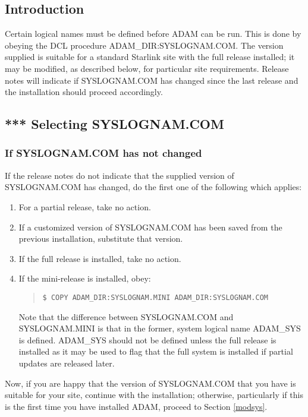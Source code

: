 \subsection{Introduction}
Certain logical names must be defined before ADAM can be run.
This is done by obeying the DCL procedure ADAM\_DIR:\-SYS\-LOGNAM.\-COM.
The version supplied is suitable for a standard Starlink site
with the full release installed; it may be modified, as described below,
for particular site requirements.
Release notes will indicate if SYS\-LOG\-NAM\-.COM has changed since the last
release and the installation should proceed accordingly.
\subsection{*** Selecting SYSLOGNAM.COM}
\subsubsection{If SYSLOGNAM.COM has not changed}
\label{nomodsys}
If the release notes do not indicate that the supplied version of
SYS\-LOGNAM\-.COM has changed, do the first one of the following which applies:
\begin{enumerate}
\item For a partial release, take no action.
\item If a customized version of SYSLOGNAM.COM has been saved from the previous
installation, substitute that version.
\item If the full release is installed, take no action.
\item If the mini-release is installed, obey:
\small \begin{quote}
\begin{verbatim}
$ COPY ADAM_DIR:SYSLOGNAM.MINI ADAM_DIR:SYSLOGNAM.COM
\end{verbatim}
\end{quote} \normalsize
Note that the difference between SYSLOGNAM.COM and SYSLOGNAM.MINI is that
in the former, system logical name ADAM\_SYS is defined.
ADAM\_SYS should not be defined unless the full release is installed as it may
be used to flag that the full system is installed if partial updates are
released later.
\end{enumerate}
Now, if you are happy that the version of SYS\-LOGNAM\-.COM that you have is
suitable for your site, continue with the installation; otherwise, particularly
if this is the first time you have installed ADAM, proceed to Section
\ref{modsys}.

